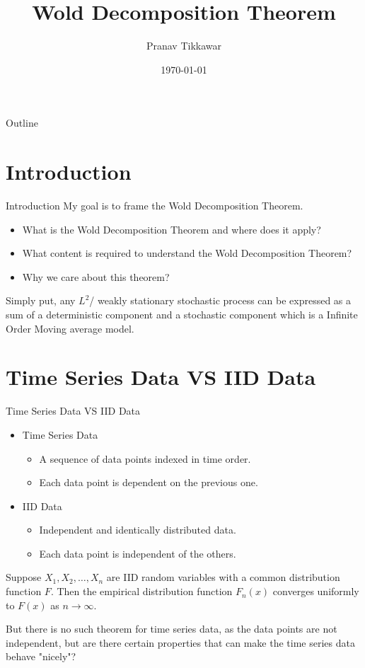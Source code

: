 \documentclass{beamer}
\title{Wold Decomposition Theorem}
\author{Pranav Tikkawar}
\date{\today}
\begin{document}
 

\begin{frame}
    \titlepage
\end{frame}

\begin{frame}{Outline}
    \tableofcontents
\end{frame}

\section{Introduction}
\begin{frame}{Introduction}
    My goal is to frame the Wold Decomposition Theorem. 
    \begin{itemize}
        \item What is the Wold Decomposition Theorem and where does it apply?
        \item What content is required to understand the Wold Decomposition Theorem? 
        \item Why we care about this theorem?
    \end{itemize}
    \begin{definition}
        Simply put, any $L^2$/ weakly stationary stochastic process can be expressed as a sum of a deterministic component and a stochastic component which is a Infinite Order Moving average model.
    \end{definition}
\end{frame}

\section{Time Series Data VS IID Data}
\begin{frame}{Time Series Data VS IID Data}
    \begin{itemize}
        \item Time Series Data
        \begin{itemize}
            \item A sequence of data points indexed in time order.
            \item Each data point is dependent on the previous one.
        \end{itemize}
        \item IID Data
        \begin{itemize}
            \item Independent and identically distributed data.
            \item Each data point is independent of the others.
        \end{itemize}
    \end{itemize}
    \begin{theorem}
        Suppose $X_1, X_2, \ldots, X_n$ are IID random variables with a common distribution function $F$. Then the empirical distribution function $F_n(x)$ converges uniformly to $F(x)$ as $n \to \infty$.
    \end{theorem}
    But there is no such theorem for time series data, as the data points are not independent, but are there certain properties that can make the time series data behave "nicely"?
\end{frame}
\end{document}
